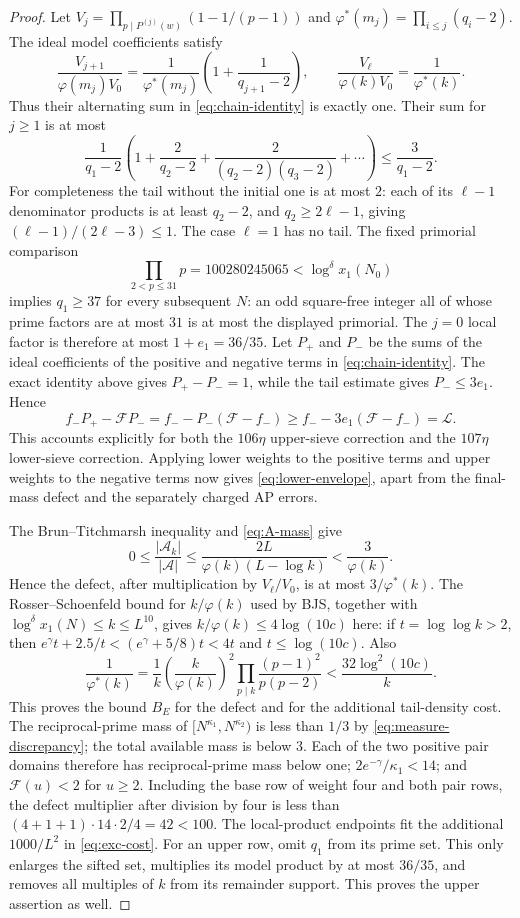 \documentclass[11pt]{article}
\theoremstyle{definition}
\newcommand{\A}{\mathcal A}
\newcommand{\phistar}{\varphi^{*}}
\newcommand{\Fup}{\mathcal F}
\newcommand{\Flow}{\mathcal L}
\begin{document}
\begin{proof}
Let $V_j=\prod_{p\mid P^{(j)}(w)}(1-1/(p-1))$ and
$\phistar(m_j)=\prod_{i\le j}(q_i-2)$.  The ideal model coefficients
satisfy
\[
 \frac{V_{j+1}}{\varphi(m_j)V_0}
 =\frac1{\phistar(m_j)}\left(1+\frac1{q_{j+1}-2}\right),\qquad
 \frac{V_\ell}{\varphi(k)V_0}=\frac1{\phistar(k)}.
\]
Thus their alternating sum in \eqref{eq:chain-identity} is exactly one.
Their sum for $j\ge1$ is at most
\[
 \frac1{q_1-2}\left(1+\frac2{q_2-2}
 +\frac2{(q_2-2)(q_3-2)}+\cdots\right)\le\frac3{q_1-2}.
\]
For completeness the tail without the initial one is at most $2$:
each of its $\ell-1$ denominator products is at least $q_2-2$,
and $q_2\ge2\ell-1$, giving
$(\ell-1)/(2\ell-3)\le1$.  The case $\ell=1$ has no tail.
The fixed primorial comparison
\[
 \prod_{2<p\le31}p=100280245065
 <\log^\delta x_1(N_0)
\]
implies $q_1\ge37$ for every subsequent $N$: an odd square-free
integer all of whose prime factors are at most $31$ is at most the
displayed primorial.  The $j=0$ local factor is therefore at most
$1+e_1=36/35$.  Let $P_+$ and $P_-$ be the sums of the ideal
coefficients of the positive and negative terms in
\eqref{eq:chain-identity}.  The exact identity above gives
$P_+-P_-=1$, while the tail estimate gives $P_-\le3e_1$.  Hence
\[
 f_-P_+-\Fup P_-
 =f_- -P_-(\Fup-f_-)
 \ge f_- -3e_1(\Fup-f_-)=\Flow.
\]
This accounts explicitly for both the $106\eta$ upper-sieve correction
and the $107\eta$ lower-sieve correction.  Applying lower weights to
the positive terms and upper weights to the negative terms now gives
\eqref{eq:lower-envelope}, apart
from the final-mass defect and the separately charged AP errors.

The Brun--Titchmarsh inequality and \eqref{eq:A-mass} give
\[
 0\le\frac{|\A_k|}{|\A|}\le
 \frac{2L}{\varphi(k)(L-\log k)}<\frac3{\varphi(k)}.
\]
Hence the defect, after multiplication by $V_\ell/V_0$, is at most
$3/\phistar(k)$.  The Rosser--Schoenfeld bound for $k/\varphi(k)$
used by BJS, together with $\log^\delta x_1(N)\le k\le L^{10}$,
gives $k/\varphi(k)\le4\log(10c)$ here:
if $t=\log\log k>2$, then
$e^\gamma t+2.5/t<(e^\gamma+5/8)t<4t$ and
$t\le\log(10c)$.  Also
\[
 \frac1{\phistar(k)}
 =\frac1k\left(\frac{k}{\varphi(k)}\right)^2
    \prod_{p\mid k}\frac{(p-1)^2}{p(p-2)}
 <\frac{32\log^2(10c)}{k}.
\]
This proves the bound $B_E$ for the defect and for the additional
tail-density cost.  The reciprocal-prime mass of
$[N^{\kappa_1},N^{\kappa_2})$ is less than $1/3$ by
\eqref{eq:measure-discrepancy}; the total available mass is below $3$.
Each of the two positive pair domains therefore has reciprocal-prime
mass below one; $2e^{-\gamma}/\kappa_1<14$; and
$\Fup(u)<2$ for $u\ge2$.  Including the base row of weight four
and both pair rows, the defect multiplier after division by four is
less than $(4+1+1)\cdot14\cdot2/4=42<100$.  The local-product
endpoints fit the additional $1000/L^2$ in \eqref{eq:exc-cost}.
For an upper row, omit $q_1$ from its prime set.  This only enlarges the
sifted set, multiplies its model product by at most $36/35$, and removes
all multiples of $k$ from its remainder support.  This proves the
upper assertion as well.
\end{proof}
\end{document}

